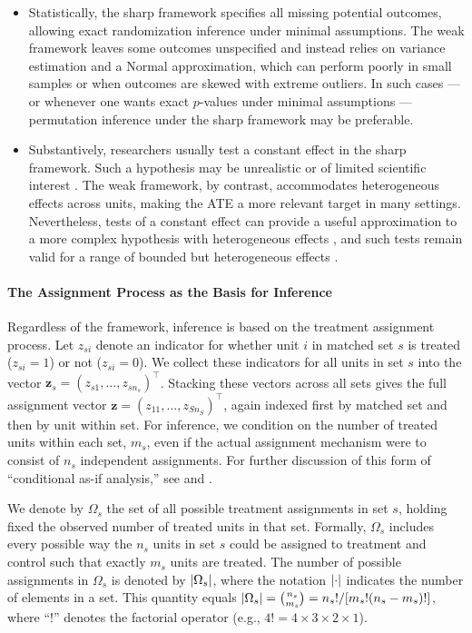 \documentclass[
  12pt,
  leqno]{article}
\DeclarePairedDelimiter\abs{\lvert}{\rvert}
\begin{document}
\begin{itemize}
\item
  Statistically, the sharp framework specifies all missing potential
  outcomes, allowing exact randomization inference under minimal
  assumptions. The weak framework leaves some outcomes unspecified and
  instead relies on variance estimation and a Normal approximation,
  which can perform poorly in small samples or when outcomes are skewed
  with extreme outliers. In such cases --- or whenever one wants exact
  \(p\)-values under minimal assumptions --- permutation inference under
  the sharp framework may be preferable.
\item
  Substantively, researchers usually test a constant effect in the sharp
  framework. Such a hypothesis may be unrealistic or of limited
  scientific interest \citep{gelman2003, gelman2011}. The weak
  framework, by contrast, accommodates heterogeneous effects across
  units, making the ATE a more relevant target in many settings.
  Nevertheless, tests of a constant effect can provide a useful
  approximation to a more complex hypothesis with heterogeneous effects
  \citep[pp.~44--46]{rosenbaum2010}, and such tests remain valid for a
  range of bounded but heterogeneous effects \citep{caugheyetal2023}.
\end{itemize}

\paragraph{The Assignment Process as the Basis for
Inference}\label{the-assignment-process-as-the-basis-for-inference}

Regardless of the framework, inference is based on the treatment
assignment process. Let \(z_{si}\) denote an indicator for whether unit
\(i\) in matched set \(s\) is treated (\(z_{si} = 1\)) or not
(\(z_{si} = 0\)). We collect these indicators for all units in set \(s\)
into the vector \(\bm{z}_s = (z_{s1}, \ldots, z_{sn_s})^{\top}\).
Stacking these vectors across all sets gives the full assignment vector
\(\bm{z} = (z_{11}, \ldots, z_{Sn_S})^{\top}\), again indexed first by
matched set and then by unit within set. For inference, we condition on
the number of treated units within each set, \(m_s\), even if the actual
assignment mechanism were to consist of \(n_s\) independent assignments.
For further discussion of this form of ``conditional as-if analysis,''
see \citet{pashleyetal2021} and \citet[pp.~289--290, fn.
15]{rosenbaum2017}.

We denote by \(\Omega_s\) the set of all possible treatment assignments
in set \(s\), holding fixed the observed number of treated units in that
set. Formally, \(\Omega_s\) includes every possible way the \(n_s\)
units in set \(s\) could be assigned to treatment and control such that
exactly \(m_s\) units are treated. The number of possible assignments in
\(\Omega_s\) is denoted by \(\abs{\Omega_s}\), where the notation
\(\abs{\cdot}\) indicates the number of elements in a set. This quantity
equals
\(\abs{\Omega_s} = \binom{n_s}{m_s} = n_s! / [m_s! (n_s - m_s)!]\),
where ``!'' denotes the factorial operator (e.g.,
\(4! = 4 \times 3 \times 2 \times 1\)).
\end{document}

